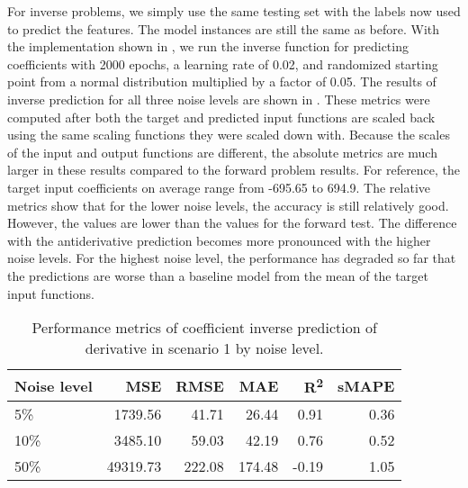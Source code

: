 For inverse problems, we simply use the same testing set with the labels now used to predict the features. The model instances are still the same as before. With the implementation shown in , we run the inverse function for predicting coefficients with 2000 epochs, a learning rate of 0.02, and randomized starting point from a normal distribution multiplied by a factor of 0.05. The results of inverse prediction for all three noise levels are shown in . These metrics were computed after both the target and predicted input functions are scaled back using the same scaling functions they were scaled down with. Because the scales of the input and output functions are different, the absolute metrics are much larger in these results compared to the forward problem results. For reference, the target input coefficients on average range from -695.65 to 694.9. The relative metrics show that for the lower noise levels, the accuracy is still relatively good. However, the values are lower than the values for the forward test. The difference with the antiderivative prediction becomes more pronounced with the higher noise levels. For the highest noise level, the performance has degraded so far that the predictions are worse than a baseline model from the mean of the target input functions.

\begin{table}[H]
  \caption{Performance metrics of coefficient inverse prediction of derivative in scenario 1 by noise level.}\label{table:scenario_1_inv_spectral_metrics}
  \centering
  \begin{tabular}{lrrrrr}
    \toprule
    Noise level & MSE      & RMSE   & MAE    & R\textsuperscript{2} & sMAPE \\
    \midrule
    5\%         & 1739.56  & 41.71  & 26.44  & 0.91                 & 0.36  \\
    10\%        & 3485.10  & 59.03  & 42.19  & 0.76                 & 0.52  \\
    50\%        & 49319.73 & 222.08 & 174.48 & -0.19                & 1.05  \\
    \bottomrule
  \end{tabular}
\end{table}

